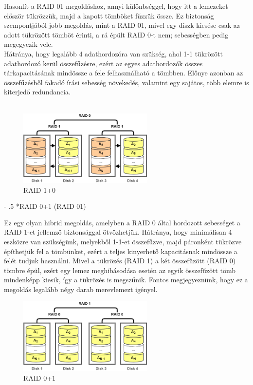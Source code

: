 \documentclass[tikz,12pt,margin=0px]{article}
\makeatletter
\renewcommand\paragraph{%
	\@startsection{paragraph}{4}{0mm}%
	{-\baselineskip}%
	{.5\baselineskip}%
	{\normalfont\normalsize\bfseries}}
\makeatother
\begin{document}
    \noindent Hasonlít a RAID 01 megoldáshoz, annyi különbséggel, hogy itt a lemezeket először tükrözzük, majd a kapott tömböket fűzzük össze. Ez biztonság szempontjából jobb megoldás, mint a RAID 01, mivel egy diszk kiesése csak az adott tükrözött tömböt érinti, a rá épült RAID 0-t nem; sebességben pedig megegyezik vele.\\

    \noindent Hátránya, hogy legalább 4 adathordozóra van szükség, ahol 1-1 tükrözött adathordozó kerül összefűzésre, ezért az egyes adathordozók összes tárkapacitásának mindössze a fele felhasználható a tömbben. Előnye azonban az összefűzésből fakadó írási sebesség növekedés, valamint egy sajátos, több elemre is kiterjedő redundancia.\\\\

    \begin{figure}[H]
        \centering
        \includegraphics[width=0.6\textwidth]{img/raid1+0.png}
        \caption{RAID 1+0}
        \label{ref:raid10}
    \end{figure}

	\paragraph*{RAID 0+1 (RAID 01)}

    \noindent Ez egy olyan hibrid megoldás, amelyben a RAID 0 által hordozott sebességet a RAID 1-et jellemző biztonsággal ötvözhetjük. Hátránya, hogy minimálisan 4 eszközre van szükségünk, melyekből 1-1-et összefűzve, majd páronként tükrözve építhetjük fel a tömbünket, ezért a teljes kinyerhető kapacitásnak mindössze a felét tudjuk használni. Mivel a tükrözés (RAID 1) a két összefűzött (RAID 0) tömbre épül, ezért egy lemez meghibásodása esetén az egyik összefűzött tömb mindenképp kiesik, így a tükrözés is megszűnik. Fontos megjegyeznünk, hogy ez a megoldás legalább négy darab merevlemezt igényel.

    \begin{figure}[H]
        \centering
        \includegraphics[width=0.6\textwidth]{img/raid0+1.png}
        \caption{RAID 0+1}
        \label{ref:raid01}
    \end{figure}
	
\end{document}
